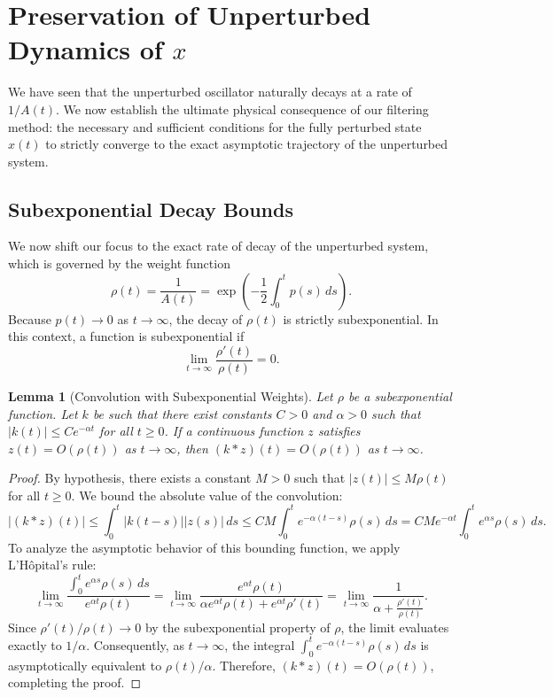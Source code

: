 \documentclass[10pt,reqno]{amsart}
\newtheorem{lemma}[theorem]{Lemma}
\theoremstyle{definition}
\begin{document}
	\section{Preservation of Unperturbed Dynamics of $x$}
	
	We have seen that the unperturbed oscillator naturally decays at a rate of $1/A(t)$. We now establish the ultimate physical consequence of our filtering method: the necessary and sufficient conditions for the fully perturbed state $x(t)$ to strictly converge to the exact asymptotic trajectory of the unperturbed system.
	
	\subsection{Subexponential Decay Bounds}
	We now shift our focus to the exact rate of decay of the unperturbed system, which is governed by the weight function $$\rho(t) = \frac{1}{A(t)} = \exp\left(-\frac{1}{2}\int_0^t p(s) \, ds\right).$$ Because $p(t) \to 0$ as $t \to \infty$, the decay of $\rho(t)$ is strictly subexponential. In this context, a function is subexponential if 
	$$\lim_{t \to \infty} \frac{\rho'(t)}{\rho(t)} = 0.$$ 
	
	\begin{lemma}[Convolution with Subexponential Weights] \label{lem:subexp_conv}
		Let $\rho$ be a subexponential function. Let $k$ be such that there exist constants $C > 0$ and $\alpha > 0$ such that $|k(t)| \le C e^{-\alpha t}$ for all $t \ge 0$. 
		If a continuous function $z$ satisfies $z(t) = O(\rho(t))$ as $t \to \infty$, then $(k * z)(t) = O(\rho(t))$ as $t \to \infty$.
	\end{lemma}
	
	\begin{proof}
		By hypothesis, there exists a constant $M > 0$ such that $|z(t)| \le M \rho(t)$ for all $t \ge 0$. We bound the absolute value of the convolution:
		\[ |(k * z)(t)| \le \int_0^t |k(t-s)| |z(s)| \, ds \le C M \int_0^t e^{-\alpha(t-s)} \rho(s) \, ds = C M e^{-\alpha t} \int_0^t e^{\alpha s} \rho(s) \, ds. \]
		To analyze the asymptotic behavior of this bounding function, we apply L'H\^opital's rule:
		\[ \lim_{t \to \infty} \frac{\int_0^t e^{\alpha s} \rho(s) \, ds}{e^{\alpha t} \rho(t)} = \lim_{t \to \infty} \frac{e^{\alpha t} \rho(t)}{\alpha e^{\alpha t} \rho(t) + e^{\alpha t} \rho'(t)} = \lim_{t \to \infty} \frac{1}{\alpha + \frac{\rho'(t)}{\rho(t)}}. \]
		Since $\rho'(t)/\rho(t) \to 0$ by the subexponential property of $\rho$, the limit evaluates exactly to $1/\alpha$. 
		Consequently, as $t \to \infty$, the integral $\int_0^t e^{-\alpha(t-s)} \rho(s) \, ds$ is asymptotically equivalent to $\rho(t)/\alpha$. Therefore, $(k * z)(t) = O(\rho(t))$, completing the proof.
	\end{proof}
	
\end{document}

